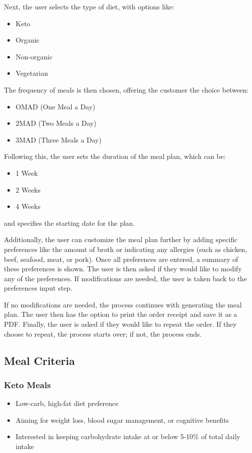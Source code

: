 \documentclass{article}
\begin{document}
Next, the user selects the type of diet, with options like:

\begin{itemize}
    \item Keto
    \item Organic
    \item Non-organic
    \item Vegetarian
\end{itemize}

The frequency of meals is then chosen, offering the customer the choice between:

\begin{itemize}
    \item OMAD (One Meal a Day)
    \item 2MAD (Two Meals a Day)
    \item 3MAD (Three Meals a Day)
\end{itemize}

Following this, the user sets the duration of the meal plan, which can be:

\begin{itemize}
    \item 1 Week
    \item 2 Weeks
    \item 4 Weeks
\end{itemize}

and specifies the starting date for the plan.

Additionally, the user can customize the meal plan further by adding specific preferences like the amount of broth or indicating any allergies (such as chicken, beef, seafood, meat, or pork). Once all preferences are entered, a summary of these preferences is shown. The user is then asked if they would like to modify any of the preferences. If modifications are needed, the user is taken back to the preferences input step.

If no modifications are needed, the process continues with generating the meal plan. The user then has the option to print the order receipt and save it as a PDF. Finally, the user is asked if they would like to repeat the order. If they choose to repeat, the process starts over; if not, the process ends.



\subsection{Meal Criteria}
\subsubsection{Keto Meals}
\begin{itemize}
    \item Low-carb, high-fat diet preference
    \item Aiming for weight loss, blood sugar management, or cognitive benefits
    \item Interested in keeping carbohydrate intake at or below 5-10\% of total daily intake
\end{itemize}
\end{document}
